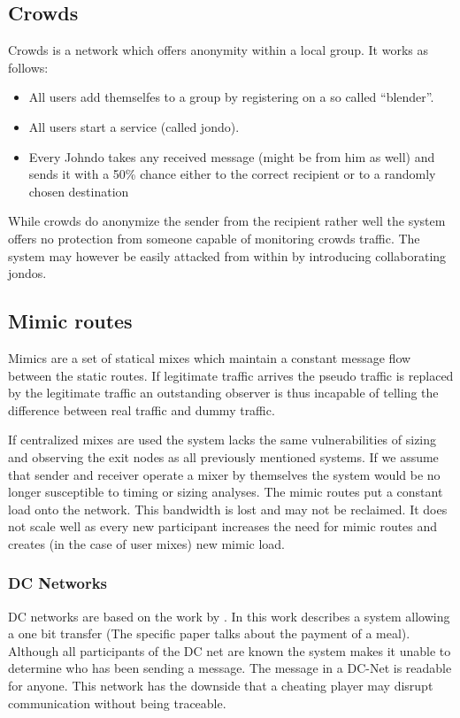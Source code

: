 
\subsection{Crowds}
Crowds is a network which offers anonymity within a local group. It works as follows:
\begin{itemize}
	\item All users add themselfes to a group by registering on a so called ``blender''.
	\item All users start a service (called jondo).
	\item Every Johndo takes any received message (might be from him as well) and sends it with a 50\% chance either to the correct recipient or to a randomly chosen destination
\end{itemize}
While crowds do anonymize the sender from the recipient rather well the system offers no protection from someone capable of monitoring crowds traffic. The system may however be easily attacked from within by introducing collaborating jondos.


\subsection{Mimic routes}
Mimics are a set of statical mixes which maintain a constant message flow between the static routes. If legitimate traffic arrives the pseudo traffic is replaced by the legitimate traffic an outstanding observer is thus incapable of telling the difference between real traffic and dummy traffic.

If centralized mixes are used the system lacks the same vulnerabilities of sizing and observing the exit nodes as all previously mentioned systems. If we assume that sender and receiver operate a mixer by themselves the system would be no longer susceptible to timing or sizing analyses. The mimic routes put a constant load onto the network. This bandwidth is lost and may not be reclaimed. It does not scale well as every new participant increases the need for mimic routes and creates (in the case of user mixes) new mimic load.

\subsubsection{DC Networks}
DC networks are based on the work  by \citeauthor{chaum-dc}\cite{chaum-dc}. In this work \citeauthor{chaum-dc} describes a system allowing a one bit transfer (The specific paper talks about the payment of a meal). Although all participants of the DC net are known the system makes it unable to determine who has been sending a message. The message in a DC-Net is readable for anyone. This network has the downside that a cheating player may disrupt communication without being traceable.


